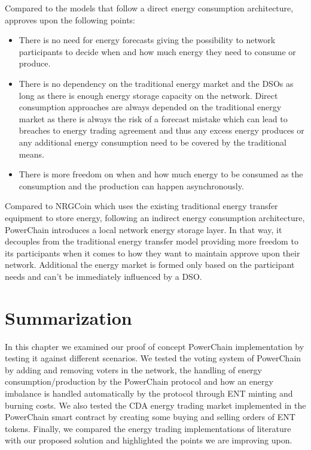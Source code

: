 Compared to the models that follow a direct energy consumption architecture, approves upon the following points:
\begin{itemize}
    \item There is no need for energy forecasts giving the possibility to network participants to decide when and how much energy they need to consume or produce.
    \item There is no dependency on the traditional energy market and the DSOs as long as there is enough energy storage capacity on the network. Direct consumption approaches are always depended on the traditional energy market as there is always
    the risk of a forecast mistake which can lead to breaches to energy trading agreement and thus any excess energy produces or any additional energy consumption need to be covered by the traditional means.
    \item There is more freedom on when and how much energy to be consumed as the consumption and the production can happen asynchronously.
\end{itemize}
Compared to NRGCoin which uses the existing traditional energy transfer equipment to store energy, following an indirect energy consumption architecture, PowerChain introduces a local network energy storage layer. In that way, it decouples from the traditional energy
transfer model providing more freedom to its participants when it comes to how they want to maintain approve upon their network. Additional the energy market is formed only based on the participant needs and can't be immediately influenced by a DSO.

\section{Summarization}
In this chapter we examined our proof of concept PowerChain implementation by testing it against different scenarios. We tested the voting system of PowerChain by adding and removing voters in the network, the handling of energy consumption/production by the PowerChain
protocol and how an energy imbalance is handled automatically by the protocol through ENT minting and burning costs. We also tested the CDA energy trading market implemented in the PowerChain smart contract by creating some buying and selling orders of ENT tokens. Finally, we compared
the energy trading implementations of literature with our proposed solution and highlighted the points we are improving upon.